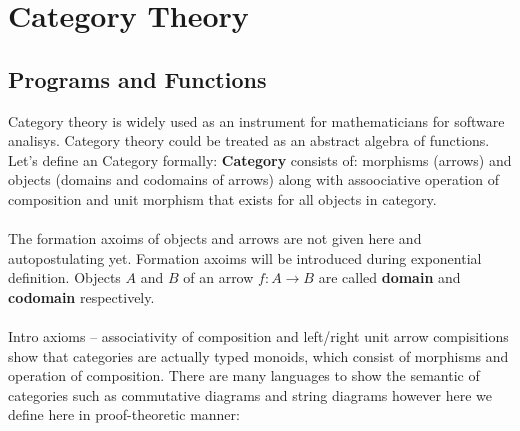 \documentclass[11pt,oneside]{article}
\begin{document}
\section{Category Theory}
\vspace{0.3cm}

   \subsection{Programs and Functions}
   Category theory is widely used as an instrument for mathematicians for software analisys.
   Category theory could be treated as an abstract algebra of functions. Let's define an Category
   formally: {\bf Category} consists of: morphisms (arrows) and objects (domains and codomains of arrows)
   along with assoociative operation of composition and unit morphism that exists for all objects in category.

   \paragraph{}
   The formation axoims of objects and arrows are not given here and autopostulating yet. Formation axoims
   will be introduced during exponential definition. Objects $A$ and $B$ of an arrow $f: A \rightarrow B$
   are called {\bf domain} and {\bf codomain} respectively.

   \paragraph{}
   Intro axioms -- associativity of composition and left/right unit arrow compisitions show that
   categories are actually typed monoids, which consist of morphisms and operation of composition.
   There are many languages to show the semantic of categories such as commutative diagrams and string diagrams
   however here we define here in proof-theoretic manner:
\end{document}
